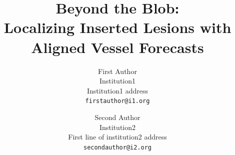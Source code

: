\documentclass[10pt,twocolumn,letterpaper]{article}
\title{Beyond the Blob:\\Localizing Inserted Lesions with Aligned Vessel Forecasts}
\author{First Author\\
Institution1\\
Institution1 address\\
{\tt\small firstauthor@i1.org}
\and
Second Author\\
Institution2\\
First line of institution2 address\\
{\tt\small secondauthor@i2.org}
}
\begin{document}
\maketitle
    







{
    \small
    
    
}

%
\end{document}
